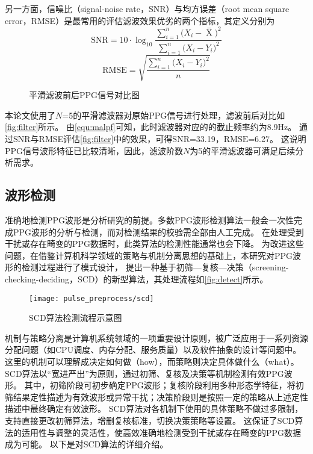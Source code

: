 另一方面，信噪比（signal-noise rate，SNR）与均方误差（root mean square error，RMSE）是最常用的评估滤波效果优劣的两个指标，其定义分别为
\begin{equation}
    \label{equ:snr}
    \text{SNR}=10 \cdot \log_{10}\frac{\sum_{i=1}^{n}{(X_i-\mathop{X} \limits^-})^2}{\sum_{i=1}^{n}{(X_i-Y_i})^2}
\end{equation}
\begin{equation}
    \label{equ:rmse}
    \text{RMSE}=\sqrt{\frac{\sum_{i=1}^{n}{(X_i-Y_i})^2}{n}}
\end{equation}

\begin{figure}[htbp]
    \centering
    \quad
    \caption{\label{fig:filter}平滑滤波前后PPG信号对比图}
\end{figure}

本论文使用了$N$=5的平滑滤波器对原始PPG信号进行处理，滤波前后对比如\autoref{fig:filter}所示。
由\autoref{equ:malpf}可知，此时滤波器对应的的截止频率约为8.9Hz。
通过SNR与RMSE评估\autoref{fig:filter}中的效果，可得$\text{SNR}$=33.19，$\text{RMSE}$=6.27。
这说明PPG信号波形特征已比较清晰，因此，滤波阶数$N$为5的平滑滤波器可满足后续分析需求。

\subsection{波形检测}
准确地检测PPG波形是分析研究的前提。多数PPG波形检测算法一般会一次性完成PPG波形的分析与检测，而对检测结果的校验需全部由人工完成\cite{Zhang2010,Chen2021,Allen2007,Feng2018,FengJiang2018}。
在处理受到干扰或存在畸变的PPG数据时，此类算法的检测性能通常也会下降。
为改进这些问题，在借鉴计算机科学领域的策略与机制分离思想的基础上\cite{Levin1975}，本研究对PPG波形的检测过程进行了模式设计，
提出一种基于初筛—复核—决策（screening-checking-deciding，SCD）的新型算法，其处理流程如\autoref{fig:detect}所示。

\begin{figure}[htbp]
    \centering
    \texttt{[image: pulse\_preprocess/scd]}
    \caption{\label{fig:detect}SCD算法检测流程示意图}
\end{figure}

机制与策略分离是计算机系统领域的一项重要设计原则，被广泛应用于一系列资源分配问题（如CPU调度、内存分配、服务质量）以及软件抽象的设计等问题中\cite{Levin1975}。
这里的机制可以理解成决定如何做（how），而策略则决定具体做什么（what）。
SCD算法以“宽进严出”为原则，通过初筛、复核及决策等机制检测有效PPG波形。
其中，初筛阶段可初步确定PPG波形；复核阶段利用多种形态学特征，将初筛结果定性描述为有效波形或异常干扰；决策阶段则是按照一定的策略从上述定性描述中最终确定有效波形。
SCD算法对各机制下使用的具体策略不做过多限制，支持直接更改初筛算法，增删复核标准，切换决策策略等设置。
这保证了SCD算法的适用性与调整的灵活性，使高效准确地检测受到干扰或存在畸变的PPG数据成为可能。
以下是对SCD算法的详细介绍。

